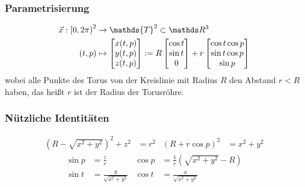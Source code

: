     \subsubsection{Parametrisierung}
      \begin{align}
      \begin{aligned}
        \vec{x}: \left[ 0, 2\pi \right)^{2}
                    &\rightarrow \mathds{T}^{2} \subset \R^{3} \\
             \left( t,p \right) 
                    &\mapsto\begin{bmatrix}
                              x(t,p) \\ y(t,p) \\ z(t,p)
                            \end{bmatrix}
                    :=R \begin{bmatrix}
                          \cos t \\
                          \sin t \\
                            0
                        \end{bmatrix}
                      +r\begin{bmatrix}
                        \cos t \cos p \\
                        \sin t \cos p \\
                        \sin p
                      \end{bmatrix}
      \end{aligned}
      \end{align}
      wobei alle Punkte des Torus von der Kreislinie mit Radius \( R \) den Abstand \( r < R \) haben,
      das heißt \( r \) ist der Radius der Torusröhre.


    \subsubsection{Nützliche Identitäten}
      \begin{align}
        \left( R - \sqrt{x^{2}+y^{2}} \right)^{2} + z^{2} &= r^{2} 
        & \left( R + r\cos p \right)^{2} &= x^{2} + y^{2}
      \end{align}
      \begin{align}
        \sin p &= \frac{z}{r} &                  \cos p &= \frac{1}{r}\left( \sqrt{x^{2}+y^{2}} - R \right)\\
        \sin t &= \frac{y}{\sqrt{x^{2}+y^{2}}} & \cos t &= \frac{x}{\sqrt{x^{2}+y^{2}}}
      \end{align}


